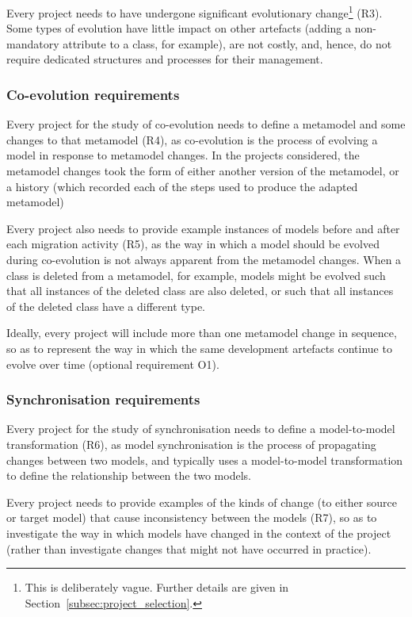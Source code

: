 Every project needs to have undergone significant evolutionary change\footnote{This is deliberately vague. Further details are given in Section~\ref{subsec:project_selection}.} (R3). Some types of evolution have little impact on other artefacts (adding a non-mandatory attribute to a class, for example), are not costly, and, hence, do not require dedicated structures and processes for their management.

\subsubsection{Co-evolution requirements}
Every project for the study of co-evolution needs to define a metamodel and some changes to that metamodel (R4), as co-evolution is the process of evolving a model in response to metamodel changes. In the projects considered, the metamodel changes took the form of either another version of the metamodel, or a history (which recorded each of the steps used to produce the adapted metamodel)

Every project also needs to provide example instances of models before and after each migration activity (R5), as the way in which a model should be evolved during co-evolution is not always apparent from the metamodel changes. When a class is deleted from a metamodel, for example, models might be evolved such that all instances of the deleted class are also deleted, or such that all instances of the deleted class have a different type.

Ideally, every project will include more than one metamodel change in sequence, so as to represent the way in which the same development artefacts continue to evolve over time (optional requirement O1).

\subsubsection{Synchronisation requirements}
Every project for the study of synchronisation needs to define a model-to-model transformation (R6), as model synchronisation is the process of propagating changes between two models, and typically uses a model-to-model transformation to define the relationship between the two models. 

Every project needs to provide examples of the kinds of change (to either source or target model) that cause inconsistency between the models (R7), so as to investigate the way in which models have changed in the context of the project (rather than investigate changes that might not have occurred in practice). 

